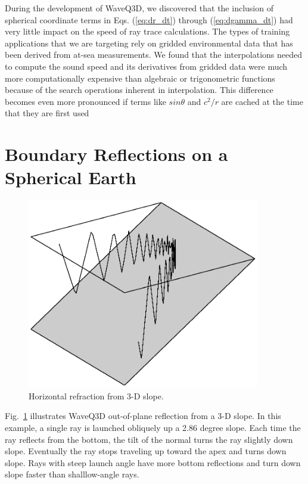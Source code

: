 \documentclass{ws-jca}
\begin{document}
During the development of WaveQ3D, we discovered that the inclusion of spherical coordinate terms in Eqs. (\ref{eq:dr_dt}) through (\ref{eq:dgamma_dt}) had very little impact on the speed of ray trace calculations.  The types of training applications that we are targeting rely on gridded environmental data that has been derived from at-sea measurements.  We found that the interpolations needed to compute the sound speed and its derivatives from gridded data were much more computationally expensive than algebraic or trigonometric functions because of the search operations inherent in interpolation.  This difference becomes even more pronounced if terms like \(sin\theta\) and $c^2/r$ are cached at the time that they are first used 

\section{Boundary Reflections on a Spherical Earth}

\begin{figure}[th]
	\centerline{\includegraphics[width=4in]{wedge_3d.eps}} 
	\vspace*{8pt}
	\caption{Horizontal refraction from 3-D slope.
	\label{fig:wedge_3d}}
\end{figure}

Fig.~\ref{fig:wedge_3d} illustrates WaveQ3D out-of-plane reflection from a 3-D slope.  
In this example, a single ray is launched obliquely up a 2.86 degree slope.  
Each time the ray reflects from the bottom, the tilt of the normal turns the ray slightly down slope.
Eventually the ray stops traveling up toward the apex and turns down slope.  
Rays with steep launch angle have more bottom reflections and turn down slope faster than shalllow-angle rays.
\end{document}
